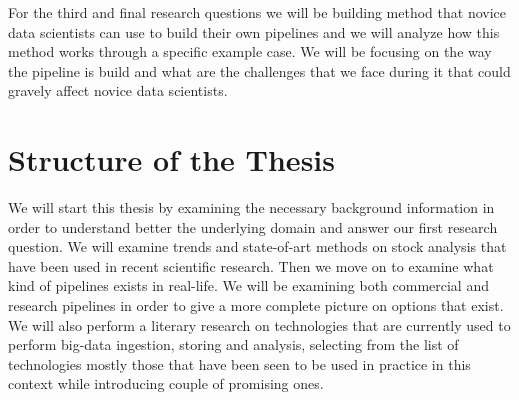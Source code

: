 For the third and final research questions we will be building method that novice data scientists can use to build their own pipelines and we will analyze how this method works through a specific example case.
We will be focusing on the way the pipeline is build and what are the challenges that we face during it that could gravely affect novice data scientists.





\section{Structure of the Thesis}

We will start this thesis by examining the necessary background information in order to understand better the underlying domain and answer our first research question.
We will examine trends and state-of-art methods on stock analysis that have been used in recent scientific research.
Then we move on to examine what kind of pipelines exists in real-life.
We will be examining both commercial and research pipelines in order to give a more complete picture on options that exist.
We will also perform a literary research on technologies that are currently used to perform big-data ingestion, storing and analysis, selecting from the list of technologies mostly those that have been seen to be used in practice in this context while introducing couple of promising ones.

